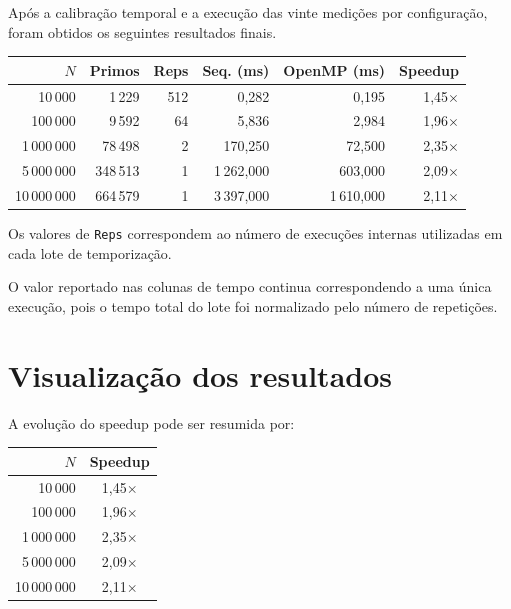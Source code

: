 Após a calibração temporal e a execução das vinte medições por configuração,
foram obtidos os seguintes resultados finais.

\begin{center}
\small
\begin{tabular}{|r|r|r|r|r|r|}
\hline
\textbf{\(N\)} &
\textbf{Primos} &
\textbf{Reps} &
\textbf{Seq. (ms)} &
\textbf{OpenMP (ms)} &
\textbf{Speedup} \\
\hline

10\,000
& 1\,229
& 512
& 0,282
& 0,195
& 1,45$\times$ \\
\hline

100\,000
& 9\,592
& 64
& 5,836
& 2,984
& 1,96$\times$ \\
\hline

1\,000\,000
& 78\,498
& 2
& 170,250
& 72,500
& 2,35$\times$ \\
\hline

5\,000\,000
& 348\,513
& 1
& 1\,262,000
& 603,000
& 2,09$\times$ \\
\hline

10\,000\,000
& 664\,579
& 1
& 3\,397,000
& 1\,610,000
& 2,11$\times$ \\
\hline
\end{tabular}
\end{center}

Os valores de \texttt{Reps} correspondem ao número de execuções internas
utilizadas em cada lote de temporização.

O valor reportado nas colunas de tempo continua correspondendo a uma única
execução, pois o tempo total do lote foi normalizado pelo número de
repetições.


\section{Visualização dos resultados}
\label{sec:atvd05-visualizacao}

A evolução do speedup pode ser resumida por:

\begin{center}
\begin{tabular}{|r|c|}
\hline
\textbf{\(N\)} & \textbf{Speedup} \\
\hline
10\,000 & 1,45$\times$ \\
100\,000 & 1,96$\times$ \\
1\,000\,000 & 2,35$\times$ \\
5\,000\,000 & 2,09$\times$ \\
10\,000\,000 & 2,11$\times$ \\
\hline
\end{tabular}
\end{center}

